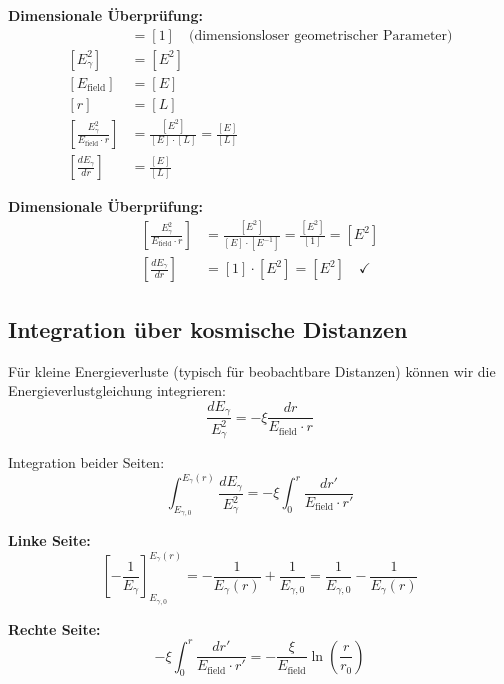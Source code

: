 \documentclass[12pt,a4paper]{report}
\begin{document}
\textbf{Dimensionale Überprüfung:}
\begin{align}
	[\xi] &= [1] \quad \text{(dimensionsloser geometrischer Parameter)} \\
	[E_\gamma^2] &= [E^2] \\
	[E_{\text{field}}] &= [E] \\
	[r] &= [L] \\
	\left[\frac{E_\gamma^2}{E_{\text{field}} \cdot r}\right] &= \frac{[E^2]}{[E] \cdot [L]} = \frac{[E]}{[L]} \\
	\left[\frac{dE_\gamma}{dr}\right] &= \frac{[E]}{[L]} 
\end{align}
	
	\textbf{Dimensionale Überprüfung:}
	\begin{align}
		\left[\frac{E_\gamma^2}{E_{\text{field}} \cdot r}\right] &= \frac{[E^2]}{[E] \cdot [E^{-1}]} = \frac{[E^2]}{[1]} = [E^2] \\
		\left[\frac{dE_\gamma}{dr}\right] &= [1] \cdot [E^2] = [E^2] \quad \checkmark
	\end{align}
	
	\subsection{Integration über kosmische Distanzen}
	\label{subsec:integration_cosmic_distances}
	
	Für kleine Energieverluste (typisch für beobachtbare Distanzen) können wir die Energieverlustgleichung integrieren:
	\begin{equation}
		\frac{dE_\gamma}{E_\gamma^2} = -\xi \frac{dr}{E_{\text{field}} \cdot r}
	\end{equation}
	
	Integration beider Seiten:
	\begin{equation}
		\int_{E_{\gamma,0}}^{E_\gamma(r)} \frac{dE_\gamma}{E_\gamma^2} = -\xi \int_0^r \frac{dr'}{E_{\text{field}} \cdot r'}
	\end{equation}
	
	\textbf{Linke Seite:}
	\begin{equation}
		\left[-\frac{1}{E_\gamma}\right]_{E_{\gamma,0}}^{E_\gamma(r)} = -\frac{1}{E_\gamma(r)} + \frac{1}{E_{\gamma,0}} = \frac{1}{E_{\gamma,0}} - \frac{1}{E_\gamma(r)}
	\end{equation}
	
	\textbf{Rechte Seite:}
	\begin{equation}
		-\xi \int_0^r \frac{dr'}{E_{\text{field}} \cdot r'} = -\frac{\xi}{E_{\text{field}}} \ln\left(\frac{r}{r_0}\right)
	\end{equation}
	
\end{document}
